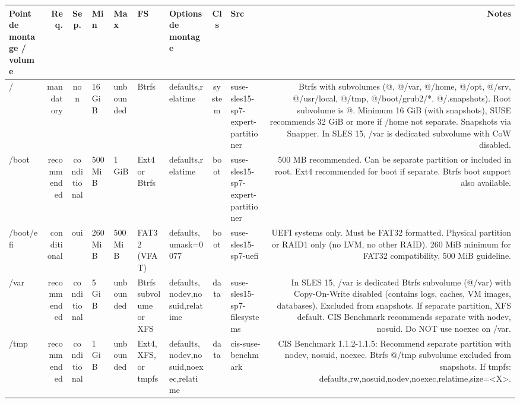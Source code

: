 \documentclass[10pt,a4paper]{article}
\renewcommand{\arraystretch}{1.2}
\begin{document}
{\renewcommand{\arraystretch}{1.15}\begin{longtable}{M R S Z Z T O C I N}\toprule\textbf{\normalfont\scriptsize Point de montage / volume} & \textbf{\normalfont\scriptsize Req.} & \textbf{\normalfont\scriptsize Sep.} & \textbf{\normalfont\scriptsize Min} & \textbf{\normalfont\scriptsize Max} & \textbf{\normalfont\scriptsize FS} & \textbf{\normalfont\scriptsize Options de montage} & \textbf{\normalfont\scriptsize Cls} & \textbf{\normalfont\scriptsize Src} & \textbf{\normalfont\scriptsize Notes}\\\midrule\endhead
/ & \textcolor{cBlock}{mandatory} & non & 16 GiB & unbounded & Btrfs & defaults,relatime & system & suse-sles15-sp7-expert-partitioner & Btrfs with subvolumes (@, @/var, @/home, @/opt, @/srv, @/usr/local, @/tmp, @/boot/grub2/*, @/.snapshots). Root subvolume is @. Minimum 16 GiB (with snapshots), SUSE recommends 32 GiB or more if /home not separate. Snapshots via Snapper. In SLES 15, /var is dedicated subvolume with CoW disabled.\\
/boot & \textcolor{cHigh}{recommended} & conditional & 500 MiB & 1 GiB & Ext4 or Btrfs & defaults,relatime & boot & suse-sles15-sp7-expert-partitioner & 500 MB recommended. Can be separate partition or included in root. Ext4 recommended for boot if separate. Btrfs boot support also available.\\
/boot/efi & \textcolor{cMed}{conditional} & \textcolor{cOk}{oui} & 260 MiB & 500 MiB & FAT32 (VFAT) & defaults,umask=0077 & boot & suse-sles15-sp7-uefi & UEFI systems only. Must be FAT32 formatted. Physical partition or RAID1 only (no LVM, no other RAID). 260 MiB minimum for FAT32 compatibility, 500 MiB guideline.\\
/var & \textcolor{cHigh}{recommended} & conditional & 5 GiB & unbounded & Btrfs subvolume or XFS & defaults,nodev,nosuid,relatime & data & suse-sles15-sp7-filesystems & In SLES 15, /var is dedicated Btrfs subvolume (@/var) with Copy-On-Write disabled (contains logs, caches, VM images, databases). Excluded from snapshots. If separate partition, XFS default. CIS Benchmark recommends separate with nodev, nosuid. Do NOT use noexec on /var.\\
/tmp & \textcolor{cHigh}{recommended} & conditional & 1 GiB & unbounded & Ext4, XFS, or tmpfs & defaults,nodev,nosuid,noexec,relatime & data & cis-suse-benchmark & CIS Benchmark 1.1.2-1.1.5: Recommend separate partition with nodev, nosuid, noexec. Btrfs @/tmp subvolume excluded from snapshots. If tmpfs: defaults,rw,nosuid,nodev,noexec,relatime,size=<X>.\\

\end{longtable}}
\end{document}
